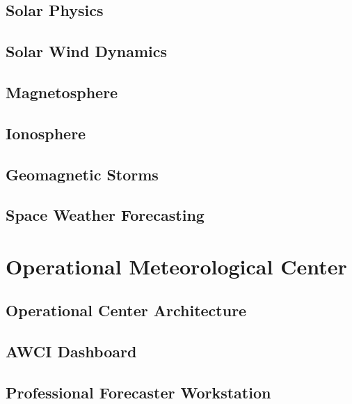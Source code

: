 \documentclass[11pt,a4paper,oneside]{report}
\begin{document}
\chapter{Solar Physics}



\chapter{Solar Wind Dynamics}



\chapter{Magnetosphere}



\chapter{Ionosphere}



\chapter{Geomagnetic Storms}



\chapter{Space Weather Forecasting}


\part{Operational Meteorological Center}


\chapter{Operational Center Architecture}



\chapter{AWCI Dashboard}



\chapter{Professional Forecaster Workstation}

\end{document}
